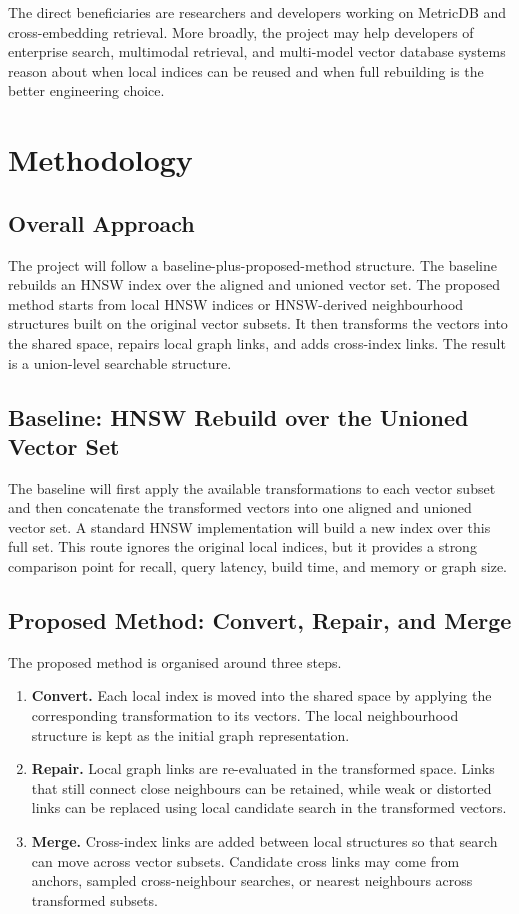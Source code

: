 \documentclass[11pt]{article}
\begin{document}
The direct beneficiaries are researchers and developers working on MetricDB and cross-embedding retrieval. More broadly, the project may help developers of enterprise search, multimodal retrieval, and multi-model vector database systems reason about when local indices can be reused and when full rebuilding is the better engineering choice.

\section{Methodology}

\subsection{Overall Approach}

The project will follow a baseline-plus-proposed-method structure. The baseline rebuilds an HNSW index over the aligned and unioned vector set. The proposed method starts from local HNSW indices or HNSW-derived neighbourhood structures built on the original vector subsets. It then transforms the vectors into the shared space, repairs local graph links, and adds cross-index links. The result is a union-level searchable structure.

\subsection{Baseline: HNSW Rebuild over the Unioned Vector Set}

The baseline will first apply the available transformations to each vector subset and then concatenate the transformed vectors into one aligned and unioned vector set. A standard HNSW implementation will build a new index over this full set. This route ignores the original local indices, but it provides a strong comparison point for recall, query latency, build time, and memory or graph size.

\subsection{Proposed Method: Convert, Repair, and Merge}

The proposed method is organised around three steps.

\begin{enumerate}
\item \textbf{Convert.} Each local index is moved into the shared space by applying the corresponding transformation to its vectors. The local neighbourhood structure is kept as the initial graph representation.
\item \textbf{Repair.} Local graph links are re-evaluated in the transformed space. Links that still connect close neighbours can be retained, while weak or distorted links can be replaced using local candidate search in the transformed vectors.
\item \textbf{Merge.} Cross-index links are added between local structures so that search can move across vector subsets. Candidate cross links may come from anchors, sampled cross-neighbour searches, or nearest neighbours across transformed subsets.
\end{enumerate}
\end{document}
